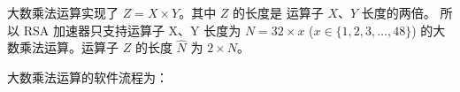 \documentclass[main\_\_CN.tex]{subfiles}
\begin{document}
大数乘法运算实现了 \begin{math}Z = X \times Y\end{math}。其中 \begin{math}Z\end{math} 的长度是
运算子 \begin{math}X\end{math}、\begin{math}Y\end{math} 长度的两倍。
所以 RSA 加速器只支持运算子 X、Y 长度为 \begin{math}N = 32 \times x\end{math} (\begin{math}x \in \{ 1, 2, 3, \dots, 48\} \end{math}) 的大数乘法运算。运算子 \begin{math}Z\end{math} 的长度 \begin{math}\hat{N}\end{math} 为 \begin{math}2 \times N\end{math}。


大数乘法运算的软件流程为：
\end{document}
